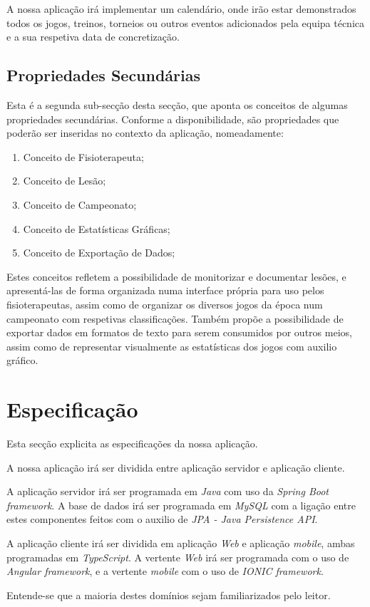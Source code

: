 A nossa aplicação irá implementar um calendário, onde irão estar demonstrados todos os jogos, treinos, torneios ou outros eventos adicionados pela equipa técnica e a sua respetiva data de concretização.



\subsection{Propriedades Secundárias} \label{sec222}
Esta é a segunda sub-secção desta secção, que aponta os conceitos de algumas propriedades secundárias. Conforme a disponibilidade, são propriedades que poderão ser inseridas no contexto da aplicação, nomeadamente:
\begin{enumerate}
	\item Conceito de Fisioterapeuta;
	\item Conceito de Lesão;
	\item Conceito de Campeonato;
	\item Conceito de Estatísticas Gráficas;
	\item Conceito de Exportação de Dados;
\end{enumerate}

Estes conceitos refletem a possibilidade de monitorizar e documentar lesões, e apresentá-las de forma organizada numa interface própria para uso pelos fisioterapeutas, assim como de organizar os diversos jogos da época num campeonato com respetivas classificações. Também propõe a possibilidade de exportar dados em formatos de texto para serem consumidos por outros meios, assim como de representar visualmente as estatísticas dos jogos com auxilio gráfico.

\section{Especificação}\label{sec23}
Esta secção explicita as especificações da nossa aplicação.

A nossa aplicação irá ser dividida entre aplicação servidor e aplicação cliente.

A aplicação servidor irá ser programada em \emph{Java} com uso da \emph{Spring Boot framework}. A base de dados irá ser programada em \emph{MySQL} com a ligação entre estes componentes feitos com o auxilio de \emph{JPA - Java Persistence API}.

A aplicação cliente irá ser dividida em aplicação \emph{Web} e aplicação \emph{mobile}, ambas programadas em \emph{TypeScript}. A vertente \emph{Web} irá ser programada com o uso de \emph{Angular framework}, e a vertente \emph{mobile} com o uso de \emph{IONIC framework}.

Entende-se que a maioria destes domínios sejam familiarizados pelo leitor.

